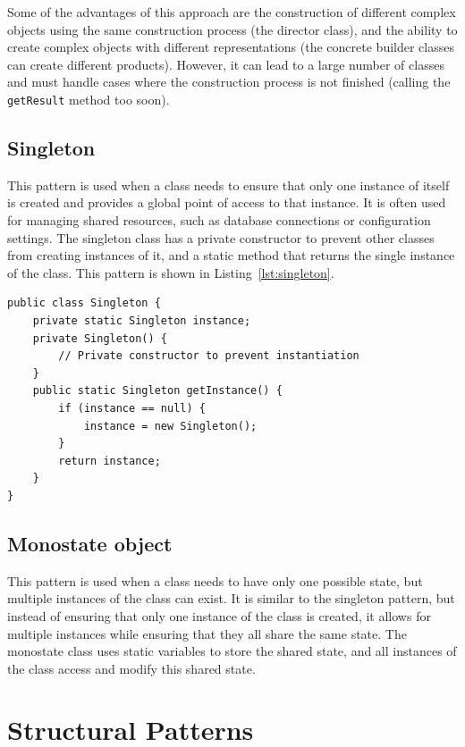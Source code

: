 Some of the advantages of this approach are the construction of different complex objects using the same construction process (the director class), and the ability to create complex objects with different representations (the concrete builder classes can create different products). However, it can lead to a large number of classes and must handle cases where the construction process is not finished (calling the \texttt{getResult} method too soon).

\subsection{Singleton}

This pattern is used when a class needs to ensure that only one instance of itself is created and provides a global point of access to that instance. It is often used for managing shared resources, such as database connections or configuration settings. The singleton class has a private constructor to prevent other classes from creating instances of it, and a static method that returns the single instance of the class. This pattern is shown in Listing~\ref{lst:singleton}.
\begin{listing}
    \begin{verbatim}
public class Singleton {
    private static Singleton instance;
    private Singleton() {
        // Private constructor to prevent instantiation
    }
    public static Singleton getInstance() {
        if (instance == null) {
            instance = new Singleton();
        }
        return instance;
    }
}
    \end{verbatim}
    \caption{Example of a Singleton class.}
    \label{lst:singleton}
\end{listing}

\subsection{Monostate object}

This pattern is used when a class needs to have only one possible state, but multiple instances of the class can exist. It is similar to the singleton pattern, but instead of ensuring that only one instance of the class is created, it allows for multiple instances while ensuring that they all share the same state. The monostate class uses static variables to store the shared state, and all instances of the class access and modify this shared state.


\section{Structural Patterns}

